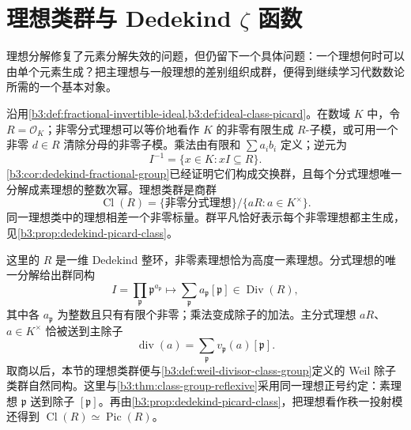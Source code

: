 
\section{理想类群与 Dedekind \texorpdfstring{\(\zeta\)}{\AlgebraPdfZeta} 函数}
\label{b3:sec:A04}

%
%
%


理想分解修复了元素分解失效的问题，但仍留下一个具体问题：一个理想何时可以由单个元素生成？把主理想与一般理想的差别组织成群，便得到继续学习代数数论所需的一个基本对象。

\ProseParagraphBreak
沿用\cref{b3:def:fractional-invertible-ideal,b3:def:ideal-class-picard}。在数域 \(K\) 中，令 \(R=\mathcal O_K\)；非零分式理想可以等价地看作 \(K\) 的非零有限生成 \(R\)-子模，或可用一个非零 \(d\in R\) 清除分母的非零子模。乘法由有限和 \(\sum a_ib_i\) 定义；逆元为
\[
	I^{-1}=\{x\in K:xI\subseteq R\}.
\]
\cref{b3:cor:dedekind-fractional-group}已经证明它们构成交换群，且每个分式理想唯一分解成素理想的整数次幂。理想类群是商群
\[
	\operatorname{Cl}(R)= \{\text{非零分式理想}\}/\{aR:a\in K^\times\}.
\]
同一理想类中的理想相差一个非零标量。群平凡恰好表示每个非零理想都主生成，见\cref{b3:prop:dedekind-picard-class}。

\ProseParagraphBreak
这里的 \(R\) 是一维 Dedekind 整环，非零素理想恰为高度一素理想。分式理想的唯一分解给出群同构
\[
	I=\prod_{\mathfrak p}\mathfrak p^{a_{\mathfrak p}} \longmapsto\sum_{\mathfrak p}a_{\mathfrak p}[\mathfrak p] \in\operatorname{Div}(R),
\]
其中各 \(a_{\mathfrak p}\) 为整数且只有有限个非零；乘法变成除子的加法。主分式理想 \(aR\)、\(a\in K^\times\) 恰被送到主除子
\[
	\operatorname{div}(a)=\sum_{\mathfrak p}v_{\mathfrak p}(a)[\mathfrak p].
\]
取商以后，本节的理想类群便与\cref{b3:def:weil-divisor-class-group}定义的 Weil 除子类群自然同构。这里与\cref{b3:thm:class-group-reflexive}采用同一理想正号约定：素理想 \(\mathfrak p\) 送到除子 \([\mathfrak p]\)。再由\cref{b3:prop:dedekind-picard-class}，把理想看作秩一投射模还得到 \(\operatorname{Cl}(R)\simeq\operatorname{Pic}(R)\)。

